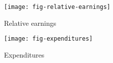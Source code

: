 \begin{frame}
	\begin{figure}[htp]\centering
		\caption{Relative earnings}\scalebox{0.35}
		{\texttt{[image: fig-relative-earnings]}}
	\end{figure}
\end{frame}
\begin{frame}
	\begin{figure}[htp]\centering
		\caption{Expenditures}\scalebox{0.35}
		{\texttt{[image: fig-expenditures]}}
	\end{figure}
\end{frame}
